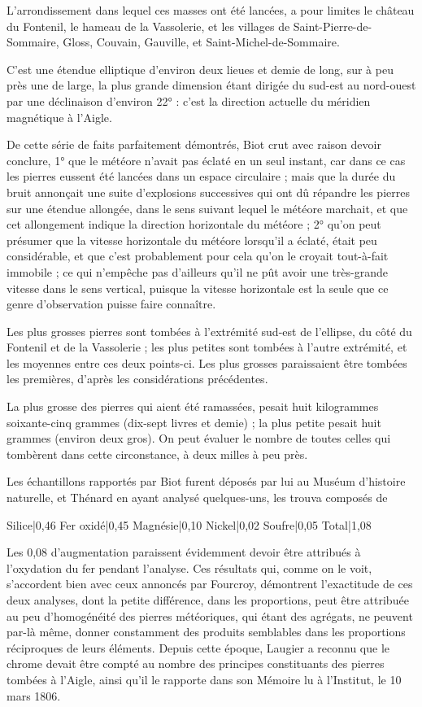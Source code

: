 \documentclass[a4paper, 12pt, oneside, french]{article}
\begin{document}
L'arrondissement dans lequel ces masses ont été lancées, a pour limites le château du Fontenil, le hameau de la Vassolerie, et les villages de Saint-Pierre-de-Sommaire, Gloss, Couvain, Gauville, et Saint-Michel-de-Sommaire.

C'est une étendue elliptique d'environ deux lieues et demie de long, sur à peu près une de large, la plus grande dimension étant dirigée du sud-est au nord-ouest par une déclinaison d'environ 22° : c'est la direction actuelle du méridien magnétique à l'Aigle.

De cette série de faits parfaitement démontrés, Biot crut avec raison devoir conclure, 1° que le météore n'avait pas éclaté en un seul instant, car dans ce cas les pierres eussent été lancées dans un espace circulaire ; mais que la durée du bruit annonçait une suite d'explosions successives qui ont dû répandre les pierres sur une étendue allongée, dans le sens suivant lequel le météore marchait, et que cet allongement indique la direction horizontale du météore ; 2° qu'on peut présumer que la vitesse horizontale du météore lorsqu'il a éclaté, était peu considérable, et que c'est probablement pour cela qu'on le croyait tout-à-fait immobile ; ce qui n'empêche pas d'ailleurs qu'il ne pût avoir une très-grande vitesse dans le sens vertical, puisque la vitesse horizontale est la seule que ce genre d'observation puisse faire connaître.

Les plus grosses pierres sont tombées à l'extrémité sud-est de l'ellipse, du côté du Fontenil et de la Vassolerie ; les plus petites sont tombées à l'autre extrémité, et les moyennes entre ces deux points-ci. Les plus grosses paraissaient être tombées les premières, d'après les considérations précédentes.

La plus grosse des pierres qui aient été ramassées, pesait huit kilogrammes soixante-cinq grammes (dix-sept livres et demie) ; la plus petite pesait huit grammes (environ deux gros). On peut évaluer le nombre de toutes celles qui tombèrent dans cette circonstance, à deux milles à peu près.

Les échantillons rapportés par Biot furent déposés par lui au Muséum d'histoire naturelle, et Thénard en ayant analysé quelques-uns, les trouva composés de

Silice|0,46  
Fer oxidé|0,45  
Magnésie|0,10  
Nickel|0,02  
Soufre|0,05  
Total|1,08

Les 0,08 d'augmentation paraissent évidemment devoir être attribués à l'oxydation du fer pendant l'analyse. Ces résultats qui, comme on le voit, s'accordent bien avec ceux annoncés par Fourcroy, démontrent l'exactitude de ces deux analyses, dont la petite différence, dans les proportions, peut être attribuée au peu d'homogénéité des pierres météoriques, qui étant des agrégats, ne peuvent par-là même, donner constamment des produits semblables dans les proportions réciproques de leurs éléments. Depuis cette époque, Laugier a reconnu que le chrome devait être compté au nombre des principes constituants des pierres tombées à l'Aigle, ainsi qu'il le rapporte dans son Mémoire lu à l'Institut, le 10 mars 1806.
\end{document}
